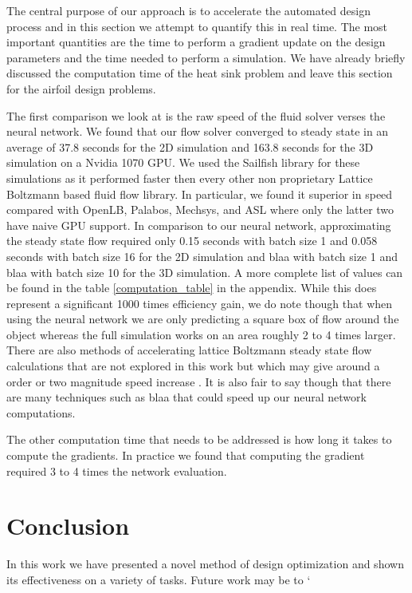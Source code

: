 \documentclass{article} %
\begin{document}
The central purpose of our approach is to accelerate the automated design process and in this section we attempt to quantify this in real time. The most important quantities are the time to perform a gradient update on the design parameters and the time needed to perform a simulation. We have already briefly discussed the computation time of the heat sink problem and leave this section for the airfoil design problems.

The first comparison we look at is the raw speed of the fluid solver verses the neural network. We found that our flow solver converged to steady state in an average of 37.8 seconds for the 2D simulation and 163.8 seconds for the 3D simulation on a Nvidia 1070 GPU. We used the Sailfish library \cite{januszewski2014sailfish} for these simulations as it performed faster then every other non proprietary Lattice Boltzmann based fluid flow library. In particular, we found it superior in speed compared with OpenLB, Palabos, Mechsys, and ASL where only the latter two have naive GPU support. In comparison to our neural network, approximating the steady state flow required only 0.15 seconds with batch size 1 and 0.058 seconds with batch size 16 for the 2D simulation and blaa with batch size 1 and blaa with batch size 10 for the 3D simulation. A more complete list of values can be found in the table \ref{computation_table} in the appendix. While this does represent a significant 1000 times efficiency gain, we do note though that when using the neural network we are only predicting a square box of flow around the object whereas the full simulation works on an area roughly 2 to 4 times larger. There are also methods of accelerating lattice Boltzmann steady state flow calculations that are not explored in this work but which may give around a order or two magnitude speed increase \cite{guo2013lattice} \cite{bernaschi2002computing}. It is also fair to say though that there are many techniques such as blaa that could speed up our neural network computations.

The other computation time that needs to be addressed is how long it takes to compute the gradients. In practice we found that computing the gradient required 3 to 4 times the network evaluation.




\section{Conclusion}

In this work we have presented a novel method of design optimization and shown its effectiveness on a variety of tasks. Future work may be to `
\end{document}

